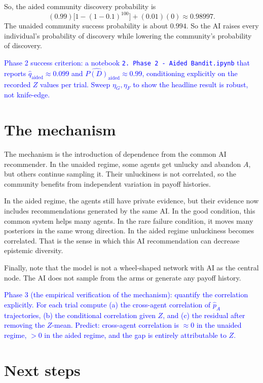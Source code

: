 \documentclass[12pt]{article}
\newcommand{\ignacio}[1]{\textcolor{blue}{#1}}
\begin{document}
So, the aided community discovery probability is
\[
  (0.99)\bigl[1 - (1 - 0.1)^{100}\bigr] + (0.01)(0) \approx 0.98997.
\]
The unaided community success probability is about $0.994$.
So the AI raises every individual's probability of discovery while lowering the community's probability of discovery.

\ignacio{Phase 2 success criterion: a notebook \texttt{2.\ Phase 2 - Aided Bandit.ipynb} that reports $\hat q_{\text{aided}} \approx 0.099$ and $\widehat{P(D)}_{\text{aided}} \approx 0.99$, conditioning explicitly on the recorded $Z$ values per trial. Sweep $\eta_G, \eta_F$ to show the headline result is robust, not knife-edge.}

\section{The mechanism}
\label{sec:mech}

The mechanism is the introduction of dependence from the common AI recommender.
In the unaided regime, some agents get unlucky and abandon $A$, but others continue sampling it.
Their unluckiness is not correlated, so the community benefits from independent variation in payoff histories.

In the aided regime, the agents still have private evidence, but their evidence now includes recommendations generated by the same AI.
In the good condition, this common system helps many agents.
In the rare failure condition, it moves many posteriors in the same wrong direction.
In the aided regime unluckiness becomes correlated.
That is the sense in which this AI recommendation can decrease epistemic diversity.

Finally, note that the model is not a wheel-shaped network with AI as the central node.
The AI does not sample from the arms or generate any payoff history.

\ignacio{Phase 3 (the empirical verification of the mechanism): quantify the correlation explicitly. For each trial compute (a) the cross-agent correlation of $\hat p_A$ trajectories, (b) the conditional correlation given $Z$, and (c) the residual after removing the $Z$-mean. Predict: cross-agent correlation is $\approx 0$ in the unaided regime, $> 0$ in the aided regime, and the gap is entirely attributable to $Z$.}

\section{Next steps}
\label{sec:next}
\end{document}
